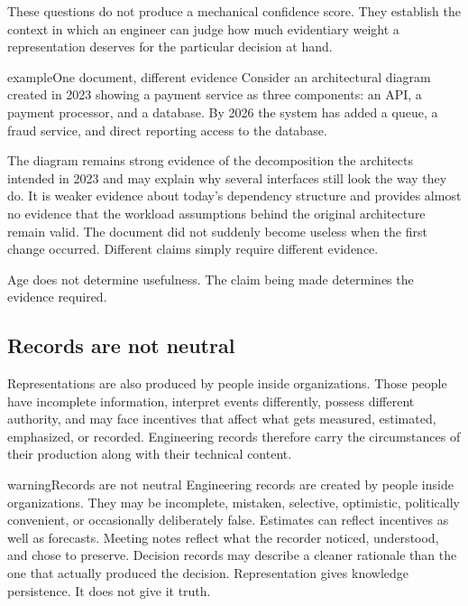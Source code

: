 These questions do not produce a mechanical confidence score. They establish the context in which an
engineer can judge how much evidentiary weight a representation deserves for the particular decision
at hand.

\begin{bookbox}{example}{One document, different evidence} %
Consider an architectural diagram created in 2023 showing a payment service as three components: an
API, a payment processor, and a database. By 2026 the system has added a queue, a fraud service, and
direct reporting access to the database.

The diagram remains strong evidence of the decomposition the architects intended in 2023 and may
explain why several interfaces still look the way they do. It is weaker evidence about today's
dependency structure and provides almost no evidence that the workload assumptions behind the
original architecture remain valid. The document did not suddenly become useless when the first
change occurred. Different claims simply require different evidence.

Age does not determine usefulness. The claim being made determines the evidence required.
\end{bookbox}

\subsection{Records are not neutral}\label{sec-records-not-neutral}

Representations are also produced by people inside organizations. Those people have incomplete
information, interpret events differently, possess different authority, and may face incentives that
affect what gets measured, estimated, emphasized, or recorded. Engineering records therefore carry
the circumstances of their production along with their technical content.

\begin{bookbox}{warning}{Records are not neutral} %
Engineering records are created by people inside organizations. They may be incomplete, mistaken,
selective, optimistic, politically convenient, or occasionally deliberately false. Estimates can
reflect incentives as well as forecasts. Meeting notes reflect what the recorder noticed,
understood, and chose to preserve. Decision records may describe a cleaner rationale than the one
that actually produced the decision. Representation gives knowledge persistence. It does not give it
truth.
\end{bookbox}

